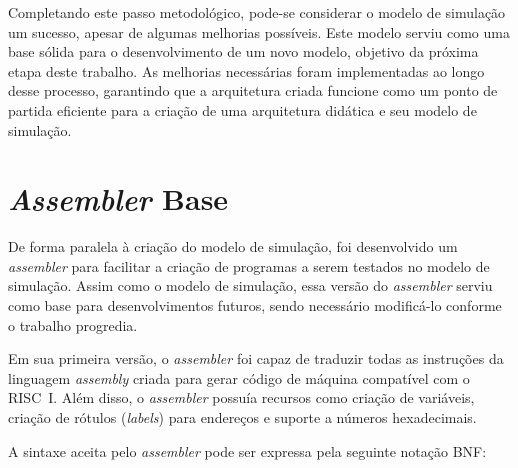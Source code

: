 \documentclass[
	12pt,				%
	openright,			%
	oneside,			%
	a4paper,			%
	english,			%
	french,				%
	spanish,			%
	brazil,				%
	]{abntex2}
\begin{document}
Completando este passo metodológico, pode-se considerar o modelo de simulação um sucesso, apesar de algumas melhorias possíveis. Este modelo serviu como uma base sólida para o desenvolvimento de um novo modelo, objetivo da próxima etapa deste trabalho. As melhorias necessárias foram implementadas ao longo desse processo, garantindo que a arquitetura criada funcione como um ponto de partida eficiente para a criação de uma arquitetura didática e seu modelo de simulação.

\section{\textit{Assembler} Base}

De forma paralela à criação do modelo de simulação, foi desenvolvido um \textit{assembler} para facilitar a criação de programas a serem testados no modelo de simulação. Assim como o modelo de simulação, essa versão do \textit{assembler} serviu como base para desenvolvimentos futuros, sendo necessário modificá-lo conforme o trabalho progredia.

Em sua primeira versão, o \textit{assembler} foi capaz de traduzir todas as instruções da linguagem \textit{assembly} criada para gerar código de máquina compatível com o RISC~I. Além disso, o \textit{assembler} possuía recursos como criação de variáveis, criação de rótulos (\textit{labels}) para endereços e suporte a números hexadecimais.

A sintaxe aceita pelo \textit{assembler} pode ser expressa pela seguinte notação BNF:
\end{document}
